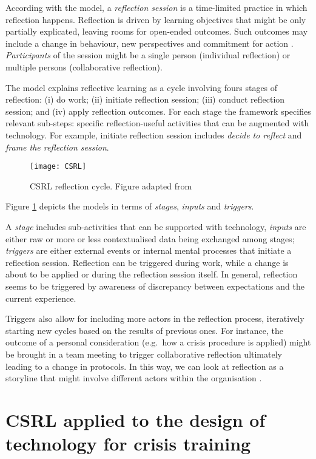 According with the model, a \emph{reflection session} is a time-limited practice in which reflection happens. Reflection is driven by learning objectives that might be only partially explicated, leaving rooms for open-ended outcomes. Such outcomes may include a change in behaviour, new perspectives and commitment for action \autocite{boud1985reflection}. \emph{Participants} of the session might be a single person (individual reflection) or multiple persons (collaborative reflection).

The model explains reflective learning as a cycle involving fours stages of reflection: (i) do work; (ii) initiate reflection session; (iii) conduct reflection session; and (iv) apply reflection outcomes. For each stage the framework specifies relevant sub-steps: specific reflection-useful activities that can be augmented with technology. For example, initiate reflection session includes \emph{decide to reflect} and \emph{frame the reflection session}.
\begin{figure}
	[tbh] \centering 
	\texttt{[image: CSRL]} \caption{CSRL reflection cycle. Figure adapted from \protect\cite{Krogstie:2013kf}} \label{fig:csrl-model} 
\end{figure}

Figure \ref{fig:csrl-model} depicts the models in terms of \emph{stages}, \emph{inputs} and \emph{triggers}.

A \emph{stage} includes sub-activities that can be supported with technology, \emph{inputs} are either raw or more or less contextualised data being exchanged among stages; \emph{triggers} are either external events or internal mental processes that initiate a reflection session. Reflection can be triggered during work, while a change is about to be applied or during the reflection session itself. In general, reflection seems to be triggered by awareness of discrepancy between expectations and the current experience.

Triggers also allow for including more actors in the reflection process, iteratively starting new cycles based on the results of previous ones. For instance, the outcome of a personal consideration (e.g.~how a crisis procedure is applied) might be brought in a team meeting to trigger collaborative reflection ultimately leading to a change in protocols. In this way, we can look at reflection as a storyline that might involve different actors within the organisation \autocite{PrPK13}.

\section{CSRL applied to the design of technology for crisis training}\label{csrl-applied-to-the-design-of-technology-for-crisis-training}

